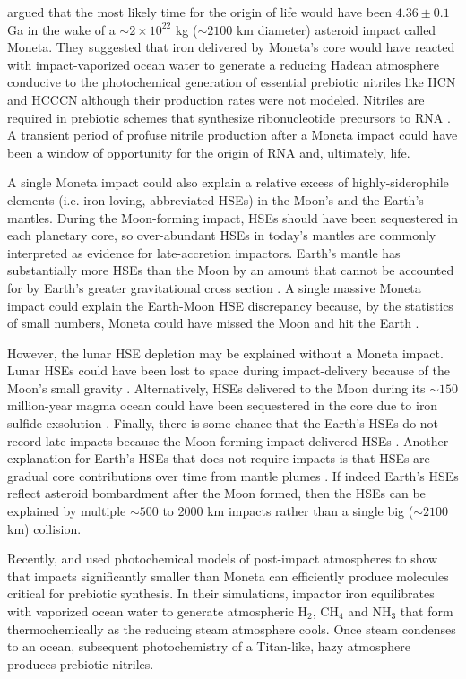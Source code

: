 \documentclass{aastex631}
\begin{document}
\citet{Benner_2020} argued that the most likely time for the origin of life would have been $4.36 \pm 0.1$ Ga in the wake of a $\sim 2 \times 10^{22}$ kg ($\sim 2100$ km diameter) asteroid impact called Moneta. They suggested that iron delivered by Moneta's core would have reacted with impact-vaporized ocean water to generate a reducing Hadean atmosphere conducive to the photochemical generation of essential prebiotic nitriles like HCN and HCCCN although their production rates were not modeled. Nitriles are required in prebiotic schemes that synthesize ribonucleotide precursors to RNA \citep{Patel_2015,Powner_2009,Becker_2019}. A transient period of profuse nitrile production after a Moneta impact could have been a window of opportunity for the origin of RNA and, ultimately, life.

A single Moneta impact could also explain a relative excess of highly-siderophile elements (i.e. iron-loving, abbreviated HSEs) in the Moon's and the Earth's mantles. During the Moon-forming impact, HSEs should have been sequestered in each planetary core, so over-abundant HSEs in today's mantles are commonly interpreted as evidence for late-accretion impactors. Earth's mantle has substantially more HSEs than the Moon by an amount that cannot be accounted for by Earth's greater gravitational cross section \citep{Day_2015}. A single massive Moneta impact could explain the Earth-Moon HSE discrepancy because, by the statistics of small numbers, Moneta could have missed the Moon and hit the Earth \citep{Sleep_1989,Bottke_2010}.

However, the lunar HSE depletion may be explained without a Moneta impact. Lunar HSEs could have been lost to space during impact-delivery because of the Moon's small gravity \citep{Kraus_2015}. Alternatively, HSEs delivered to the Moon during its $\sim 150$ million-year magma ocean could have been sequestered in the core due to iron sulfide exsolution \citep{Morbidelli_2018,Rubie_2016}. Finally, there is some chance that the Earth's HSEs do not record late impacts because the Moon-forming impact delivered HSEs \citep{Sleep_2016}. Another explanation for Earth's HSEs that does not require impacts is that HSEs are gradual core contributions over time from mantle plumes \citep{Halliday_2023,Mundl_2020}. If indeed Earth's HSEs reflect asteroid bombardment after the Moon formed, then the HSEs can be explained by multiple $\sim 500$ to 2000 km impacts rather than a single big ($\sim 2100$ km) collision.

Recently, \citet{Wogan_2023} and \citet{Zahnle_2020} used photochemical models of post-impact atmospheres to show that impacts significantly smaller than Moneta can efficiently produce molecules critical for prebiotic synthesis. In their simulations, impactor iron equilibrates with vaporized ocean water to generate atmospheric H$_2$, CH$_4$ and NH$_3$ that form thermochemically as the reducing steam atmosphere cools. Once steam condenses to an ocean, subsequent photochemistry of a Titan-like, hazy atmosphere produces prebiotic nitriles. 
\end{document}
